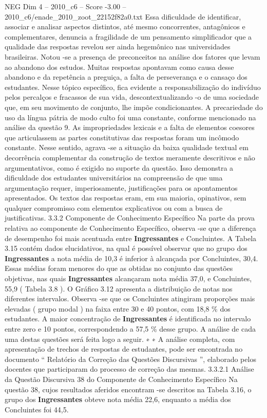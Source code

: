 \begin{textsample}{NEG Dim 4 – 2010\_c6 – Score -3.00 – 2010\_c6/enade\_2010\_zoot\_22152f82a0.txt}
Essa dificuldade de identificar, associar e analisar aspectos distintos, até mesmo concorrentes, antagônicos e complementares, denuncia a fragilidade de um pensamento simplificador que a qualidade das respostas revelou ser ainda hegemônico nas universidades brasileiras.
Notou -se a presença de preconceitos na análise dos fatores que levam ao abandono dos estudos.
Muitas respostas apontavam como causa desse abandono e da repetência a preguiça, a falta de perseverança e o cansaço dos estudantes.
Nesse tópico específico, fica evidente a responsabilização do indivíduo pelos percalços e fracassos de sua vida, descontextualizando -o de uma sociedade que, em seu movimento de conjunto, lhe impõe condicionantes.
A precariedade do uso da língua pátria de modo culto foi uma constante, conforme mencionado na análise da questão 9.
As impropriedades lexicais e a falta de elementos coesores que articulassem as partes constitutivas das respostas foram um incômodo constante.
Nesse sentido, agrava -se a situação da baixa qualidade textual em decorrência complementar da construção de textos meramente descritivos e não argumentativos, como é exigido no suporte da questão.
Isso demonstra a dificuldade dos estudantes universitários na compreensão de que uma argumentação requer, imperiosamente, justificações para os apontamentos apresentados.
Os textos das respostas eram, em sua maioria, opinativos, sem qualquer compromisso com elementos explicativos ou com a busca de justificativas. 3.3.2 Componente de Conhecimento Específico Na parte da prova relativa ao componente de Conhecimento Específico, observa -se que a diferença de desempenho foi mais acentuada entre \textbf{Ingressantes} e Concluintes.
A Tabela 3.15 contém dados elucidativos, na qual é possível observar que no grupo dos \textbf{Ingressantes} a nota média de 10,3 é inferior à alcançada por Concluintes, 30,4.
Essas médias foram menores do que as obtidas no conjunto das questões objetivas, nas quais \textbf{Ingressantes} alcançaram nota média 37,0, e Concluintes, 55,9 ( Tabela 3.8 ).
O Gráfico 3.12 apresenta a distribuição de notas nos diferentes intervalos.
Observa -se que os Concluintes atingiram proporções mais elevadas ( grupo modal ) na faixa entre 30 e 40 pontos, com 18,8 \% dos estudantes.
A maior concentração de \textbf{Ingressantes} é identificada no intervalo entre zero e 10 pontos, correspondendo a 57,5 \% desse grupo.
A análise de cada uma destas questões será feita logo a seguir. ∗ ∗ A análise completa, com apresentação de trechos de respostas de estudantes, pode ser encontrada no documento “ Relatório da Correção das Questões Discursivas ”, elaborado pelos docentes que participaram do processo de correção das mesmas. 3.3.2.1 Análise da Questão Discursiva 38 do Componente de Conhecimento Específico Na questão 38, cujos resultados aferidos encontram -se descritos na Tabela 3.16, o grupo dos \textbf{Ingressantes} obteve nota média 22,6, enquanto a média dos Concluintes foi 44,5.

\end{textsample}
